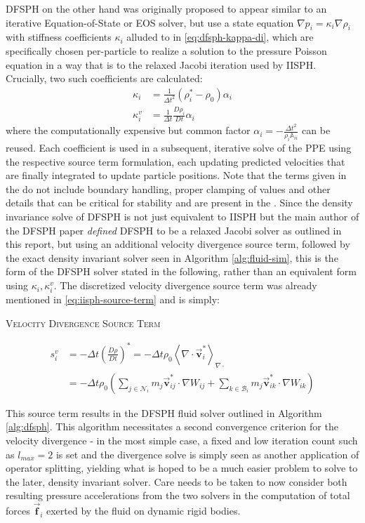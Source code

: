 \documentclass[oneside, a4paper]{book}
\newcommand{\equationnamed}[2]{%
  \setlength{\fboxsep}{2pt} %
  \setlength{\fboxrule}{0.01pt}
  \begin{center}
    \begin{minipage}{\textwidth}
      \begin{center}\textsc{#1}\end{center}
      #2
    \end{minipage}
  \end{center}
}
\newcommand\angled[1]{\left\langle#1\right\rangle}
\newcommand\vek[1]{\vec{\bm{#1}}}
\newcommand\mat[1]{{\mathds{#1}}}
\newcommand\br[1]{\left(#1\right)}
\newcommand\divergence{{\nabla\cdot}}
\begin{document}
    DFSPH on the other hand was originally proposed to appear similar to an iterative Equation-of-State or EOS solver, but use a state equation $\nabla p_i = \kappa_i\nabla \rho_i$ \autocite{dfsph} with stiffness coefficients $\kappa_i$ alluded to in \autoref{eq:dfsph-kappa-di}, which are specifically chosen per-particle to realize a solution to the pressure Poisson equation in a way that is \autocite[essentially equivalent]{2022-survey-equographics-star} to the relaxed Jacobi iteration used by IISPH. Crucially, two such coefficients are calculated:
    \begin{align}
      \kappa_i &= \frac{1}{\Delta t^2}\br{\rho_i^* - \rho_0}\alpha_i \\
      \kappa_i^v &= \frac{1}{\Delta t}\frac{D \rho_i}{D t}\alpha_i
    \end{align}
    where the computationally expensive but common factor $\alpha_i = -\frac{\Delta t^2}{\rho_i\mat{A}_{ii}}$ can be reused. Each coefficient is used in a subsequent, iterative solve of the PPE using the respective source term formulation, each updating predicted velocities that are finally integrated to update particle positions. Note that the terms given in the \autocite[DFSPH paper]{dfsph} do not include boundary handling, proper clamping of values and other details that can be critical for stability and are present in the \autocite[authors' own implementation]{SPlisHSPlasH_Library}. Since the density invariance solve of DFSPH is not just equivalent to IISPH but the main author of the DFSPH paper \autocite{dfsph} \autocite[in a later paper]{consistent-boundaries} \textit{defined} DFSPH to be a relaxed Jacobi solver as outlined in this report, but using an additional velocity divergence source term, followed by the exact density invariant solver seen in Algorithm \ref{alg:fluid-sim}, this is the form of the DFSPH solver stated in the following, rather than an equivalent form using $\kappa_i, \kappa_i^v$. The discretized velocity divergence source term was already mentioned in \autoref{eq:iisph-source-term} and is simply:
    \equationnamed{Velocity Divergence Source Term}{\begin{align}\label{eq:velocity-divergence-source-term}
      s_i^v &= - \Delta t \br{\frac{D\rho}{D t}}^* =- \Delta t  \rho_0 \angled{\divergence\vek{v}^*_i}_{\divergence} \\
      &= -\Delta t \rho_0  \br{
        \sum_{j\in\mathcal{N}_i} m_j\vek{v}_{ij}^*\cdot \nabla W_{ij}
        + \sum_{k\in\mathcal{B}_i} m_j\vek{v}_{ik}^*\cdot \nabla W_{ik}
      }
    \end{align}}
    This source term results in the DFSPH fluid solver outlined in Algorithm \ref{alg:dfsph}. This algorithm necessitates a second convergence criterion for the velocity divergence - in the most simple case, a fixed and low iteration count such as $l_{max} = 2$ is set and the divergence solve is simply seen as another application of operator splitting, yielding what is hoped to be a much easier problem to solve to the later, density invariant solver. Care needs to be taken to now consider both resulting pressure accelerations from the two solvers in the computation of total forces $\vek{f}_i$ exerted by the fluid on dynamic rigid bodies. 
    
\end{document}
